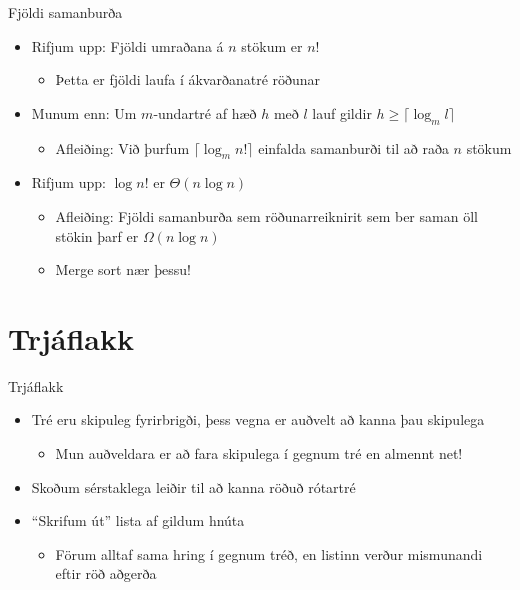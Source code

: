 \documentclass[handout]{beamer}
\begin{document}
\begin{frame}{Fjöldi samanburða}
    \begin{itemize}
        \item Rifjum upp: Fjöldi umraðana á $n$ stökum er $n!$ \pause
        \begin{itemize}
            \item Þetta er fjöldi laufa í ákvarðanatré röðunar
        \end{itemize}
            \item Munum enn: Um $m$-undartré af hæð $h$ með $l$ lauf gildir $h \geq \lceil \log_m l\rceil$ \pause
        \begin{itemize}
            \item Afleiðing: Við þurfum $\lceil \log_m n! \rceil$ einfalda samanburði til að raða $n$ stökum \pause
        \end{itemize}
            \item Rifjum upp: $\log n!$ er $\Theta(n \log n)$ \pause
        \begin{itemize}
            \item Afleiðing: Fjöldi samanburða sem röðunarreiknirit sem ber saman öll stökin þarf er $\Omega(n\log n)$
            \item Merge sort nær þessu!
        \end{itemize}
    \end{itemize}
\end{frame}

\section{Trjáflakk}

\begin{frame}{Trjáflakk}
\begin{itemize}
 \item Tré eru skipuleg fyrirbrigði, þess vegna er auðvelt að kanna þau skipulega
 \begin{itemize}
  \item Mun auðveldara er að fara skipulega í gegnum tré en almennt net!
 \end{itemize}
 \item Skoðum sérstaklega leiðir til að kanna röðuð rótartré
 \item ``Skrifum út'' lista af gildum hnúta
 \begin{itemize}
  \item Förum alltaf sama hring í gegnum tréð, en listinn verður mismunandi eftir röð aðgerða
 \end{itemize}
\end{itemize}
\end{frame}
\end{document}
